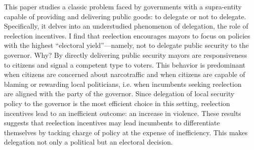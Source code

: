 \documentclass[12pt]{amsart}
\numberwithin{equation}{section}
\theoremstyle{definition}
\theoremstyle{definition}
\theoremstyle{definition}
\begin{document}
This paper studies a classic problem faced by governments with a supra-entity capable of providing and delivering public goods: to delegate or not to delegate. Specifically, it delves into an understudied phenomenon of delegation, the role of reelection incentives. I find that reelection encourages mayors to focus on policies with the highest “electoral yield”—namely, not to delegate public security to the governor. Why? By directly delivering public security mayors are responsiveness to citizens and signal a competent type to voters. This behavior is predominant when citizens are concerned about narcotraffic and when citizens are capable of blaming or rewarding local politicians, i.e. when incumbents seeking reelection are aligned with the party of the governor. Since delegation of local security policy to the governor is the most efficient choice in this setting, reelection incentives lead to an inefficient outcome: an increase in violence. These results suggests that reelection incentives may lead incumbents to differentiate themselves by tacking charge of policy at the expense of inefficiency. This makes delegation not only a political but an electoral decision. 
  
    
            
\clearpage
   
 
      
\end{document}
